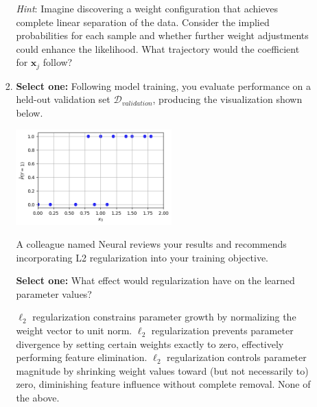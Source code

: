 \documentclass[11pt,addpoints,answers]{exam}
\newcommand{\xv}{\mathbf{x}}
\newcommand{\sone}{\textbf{Select one: }}
\begin{document}
\begin{enumerate}
\begin{enumerate}[label=\alph*), itemsep=10pt]
\begin{enumerate}[label=(\roman*), leftmargin=*]
				\textit{Hint}: Imagine discovering a weight configuration that achieves complete linear separation of the data. Consider the implied probabilities for each sample and whether further weight adjustments could enhance the likelihood. What trajectory would the coefficient for $\xv_j$ follow?
				
				\begin{your_solution}[height=5cm]
				\end{your_solution}
				
				\item \sone   
				Following model training, you evaluate performance on a held-out validation set $\mathcal{D}_{validation}$, producing the visualization shown below.
				
				\begin{center}
					\includegraphics[width=6cm]{fig/Plot Validation.png}
				\end{center}
				
				A colleague named Neural reviews your results and recommends incorporating L2 regularization into your training objective. 
				
				\sone What effect would regularization have on the learned parameter values?
				
				
				{%
					
					\begin{checkboxes}
						\choice $\ell_2$ regularization constrains parameter growth by normalizing the weight vector to unit norm.
						\choice $\ell_2$ regularization prevents parameter divergence by setting certain weights exactly to zero, effectively performing feature elimination. 
						\choice $\ell_2$ regularization controls parameter magnitude by shrinking weight values toward (but not necessarily to) zero, diminishing feature influence without complete removal. 
						\choice None of the above.
					\end{checkboxes}
				}
				
				
			\end{enumerate}
		\end{enumerate}
		
	\end{enumerate}
\end{document}
